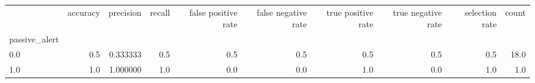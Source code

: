 \begin{tabular}{lrrrrrrrrr}
\toprule
{} &  accuracy &  precision &  recall &  false positive rate &  false negative rate &  true positive rate &  true negative rate &  selection rate &  count \\
passive\_alert &           &            &         &                      &                      &                     &                     &                 &        \\
\midrule
0.0           &       0.5 &   0.333333 &     0.5 &                  0.5 &                  0.5 &                 0.5 &                 0.5 &             0.5 &   18.0 \\
1.0           &       1.0 &   1.000000 &     1.0 &                  0.0 &                  0.0 &                 1.0 &                 0.0 &             1.0 &    1.0 \\
\bottomrule
\end{tabular}
